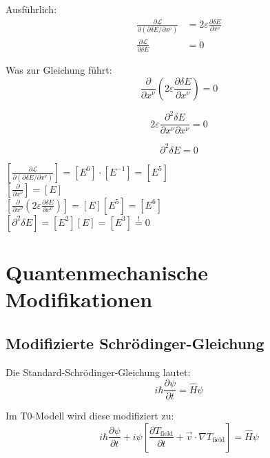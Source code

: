 \documentclass[12pt,a4paper]{article}
\newcommand{\tfield}{T_{\text{field}}}
\newcommand{\dfield}{\delta E}
\theoremstyle{definition}
\begin{document}
	Ausführlich:
	\begin{align}
		\frac{\partial \mathcal{L}}{\partial(\partial \dfield/\partial x^\nu)} &= 2\varepsilon \frac{\partial \dfield}{\partial x^\nu} \\
		\frac{\partial \mathcal{L}}{\partial \dfield} &= 0
	\end{align}
	
	Was zur Gleichung führt:
	\begin{equation}
		\frac{\partial}{\partial x^\nu}\left(2\varepsilon \frac{\partial \dfield}{\partial x^\nu}\right) = 0
	\end{equation}
	
	\begin{equation}
		2\varepsilon \frac{\partial^2 \dfield}{\partial x^\nu \partial x^\nu} = 0
	\end{equation}
	
	\begin{equation}
		\boxed{\partial^2 \dfield = 0}
	\end{equation}
	
	\begin{einheitencheck}
		$[\frac{\partial \mathcal{L}}{\partial(\partial \dfield/\partial x^\nu)}] = [E^6] \cdot [E^{-1}] = [E^5]$\\
		$[\frac{\partial}{\partial x^\nu}] = [E]$\\
		$[\frac{\partial}{\partial x^\nu}\left(2\varepsilon \frac{\partial \dfield}{\partial x^\nu}\right)] = [E][E^5] = [E^6]$\\
		$[\partial^2 \dfield] = [E^2][E] = [E^3] \stackrel{!}{=} 0$ \checkmark
	\end{einheitencheck}
	
	\section{Quantenmechanische Modifikationen}

\subsection{Modifizierte Schrödinger-Gleichung}

Die Standard-Schrödinger-Gleichung lautet:
\begin{equation}
	i \hbar \frac{\partial\psi}{\partial t} = \hat{H}\psi
\end{equation}

Im T0-Modell wird diese modifiziert zu:
\begin{equation}
	\boxed{i \hbar \frac{\partial\psi}{\partial t} + i\psi\left[\frac{\partial \tfield}{\partial t} + \vec{v} \cdot \nabla \tfield\right] = \hat{H}\psi}
\end{equation}
\end{document}
